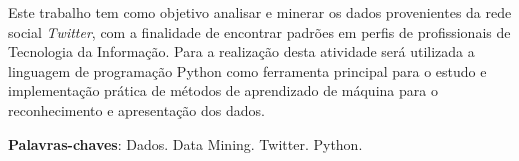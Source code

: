 \begin{resumo}[RESUMO]	
Este trabalho tem como objetivo analisar e minerar os dados provenientes da rede social \textit{Twitter}, com a finalidade de encontrar padrões em perfis de profissionais de Tecnologia da Informação. Para a realização desta atividade será utilizada a linguagem de programação Python como ferramenta principal para o estudo e implementação prática de métodos de aprendizado de máquina para o reconhecimento e apresentação dos dados.


 \vspace{\onelineskip}
    
 \noindent
 \textbf{Palavras-chaves}: Dados. Data Mining. Twitter. Python.
\end{resumo}

